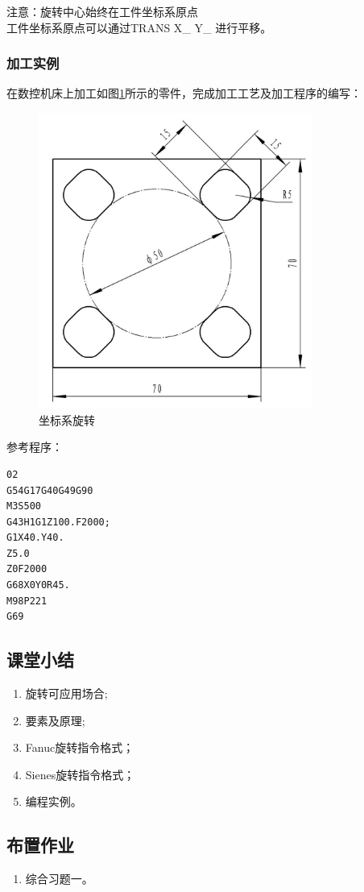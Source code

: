 注意：旋转中心始终在工件坐标系原点\\
工件坐标系原点可以通过TRANS X\_ Y\_ 进行平移。\\

\subsubsection{加工实例}
在数控机床上加工如图\ref{坐标系旋转}所示的零件，完成加工工艺及加工程序的编写：
\begin{figure}
	\centering	\includegraphics[width=0.8\textwidth]{images/7-2.jpg}
	\caption{坐标系旋转} \label{坐标系旋转}
\end{figure}
参考程序：

\begin{verbatim}
02
G54G17G40G49G90
M3S500
G43H1G1Z100.F2000;
G1X40.Y40.
Z5.0
Z0F2000
G68X0Y0R45.
M98P221
G69
\end{verbatim}


\subsection{课堂小结}
\begin{enumerate}[1、]
	\item 旋转可应用场合;
	\item 要素及原理;
	\item Fanuc旋转指令格式；
	\item Sienes旋转指令格式；
	\item 编程实例。
\end{enumerate}

\vfill
\subsection{布置作业}
\begin{enumerate}[1、]
	\item 综合习题一。 
\end{enumerate}
\vfill